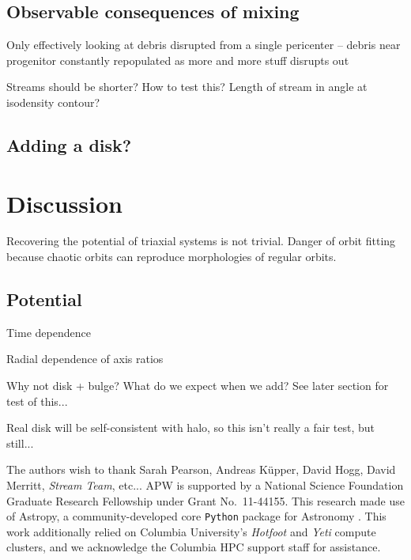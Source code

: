 \documentclass[letterpaper,12pt,preprint]{aastex}
\begin{document}
\subsection{Observable consequences of mixing}

Only effectively looking at debris disrupted from a single pericenter -- debris near progenitor constantly repopulated as more and more stuff disrupts out

Streams should be shorter? How to test this? Length of stream in angle at isodensity contour?

\subsection{Adding a disk?}

\section{Discussion}\label{sec:discussion}

Recovering the potential of triaxial systems is not trivial. Danger of orbit fitting because chaotic orbits can reproduce morphologies of regular orbits.

\subsection{Potential}

Time dependence

Radial dependence of axis ratios

Why not disk + bulge? What do we expect when we add? See later section for test of this...

Real disk will be self-consistent with halo, so this isn't really a fair test, but still...

\acknowledgements
The authors wish to thank Sarah Pearson, Andreas K\"upper, David Hogg, David Merritt, \emph{Stream Team}, etc...
APW is supported by a National Science Foundation Graduate Research Fellowship under Grant No.\ 11-44155. 
This research made use of Astropy, a community-developed core \texttt{Python} package for Astronomy \citep{astropy13}.
This work additionally relied on Columbia University's \emph{Hotfoot} and \emph{Yeti} compute clusters, and we acknowledge the Columbia HPC support staff for assistance.



\end{document}
